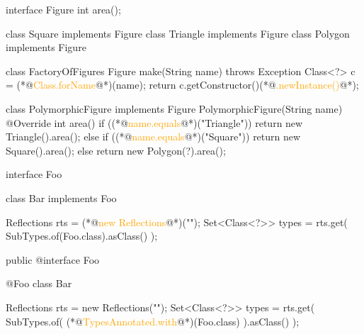\documentclass{article}
\begin{document}
\begin{lnSnippet}
interface Figure
  int area();

class Square implements Figure
class Triangle implements Figure
class Polygon implements Figure

class FactoryOfFigures
  Figure make(String name) throws Exception {
    Class<?> c = (*@\textcolor{orange}{Class.forName}@*)(name);
    return c.getConstructor()(*@\textcolor{orange}{.newInstance()}@*);
  }
\end{lnSnippet}
\begin{lnSnippet}
class PolymorphicFigure implements Figure
  PolymorphicFigure(String name)
  @Override int area() {
    if ((*@\textcolor{orange}{name.equals}@*)("Triangle")) {
      return new Triangle().area();
    } else if ((*@\textcolor{orange}{name.equals}@*)("Square")) {
      return new Square().area();
    } else {
      return new Polygon(?).area();
    }
  }
\end{lnSnippet}


\begin{lnSnippet}
interface Foo {}

class Bar implements Foo {}

Reflections rts =
  (*@\textcolor{orange}{new Reflections}@*)("");
Set<Class<?>> types = rts.get(
  SubTypes.of(Foo.class).asClass()
);
\end{lnSnippet}
\begin{lnSnippet}
public @interface Foo {}

@Foo
class Bar {}

Reflections rts =
  new Reflections("");
Set<Class<?>> types = rts.get(
  SubTypes.of(
    (*@\textcolor{orange}{TypesAnnotated.with}@*)(Foo.class)
  ).asClass()
);
\end{lnSnippet}
\end{document}
